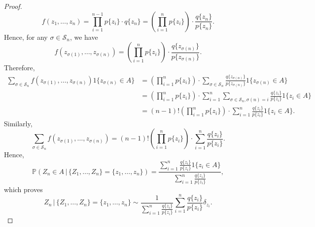 \documentclass[10pt,a4paper]{amsart}
\newcommand{\cS}{\mathcal{S}}
\renewcommand{\P}{\mathbb{P}}
\begin{document}
\begin{proof}
    \begin{equation*}
        f(z_1, \ldots, z_n) = \prod_{i = 1}^{n - 1} p\{z_i\} \cdot q\{z_n\} = \left(\prod_{i = 1}^{n} p\{z_i\}\right) \cdot \frac{q\{z_n\}}{p\{z_n\}}.
    \end{equation*}
    Hence, for any $\sigma \in \cS_n$, we have
    \begin{equation*}
        f(z_{\sigma(1)}, \ldots, z_{\sigma(n)}) = \left(\prod_{i = 1}^{n} p\{z_i\}\right) \cdot \frac{q\{z_{\sigma(n)}\}}{p\{z_{\sigma(n)}\}}.
    \end{equation*}
    Therefore, 
    \begin{equation*}
        \begin{split}
            \sum_{\sigma \in \cS_n} f(z_{\sigma(1)}, \ldots, z_{\sigma(n)}) 1\{z_{\sigma(n)} \in A\} 
            & = \left(\prod_{i = 1}^{n} p\{z_i\}\right) \cdot \sum_{\sigma \in \cS_n} \frac{q\{z_{\sigma(n)}\}}{p\{z_{\sigma(n)}\}} 1\{z_{\sigma(n)} \in A\} \\
            & = \left(\prod_{i = 1}^{n} p\{z_i\}\right) \cdot \sum_{i = 1}^{n} \sum_{\sigma \in \cS_n, \sigma(n) = i} \frac{q\{z_i\}}{p\{z_i\}} 1\{z_i \in A\} \\
            & = (n - 1)! \left(\prod_{i = 1}^{n} p\{z_i\}\right) \cdot \sum_{i = 1}^{n} \frac{q\{z_i\}}{p\{z_i\}} 1\{z_i \in A\}.            
        \end{split}
    \end{equation*}
    Similarly, 
    \begin{equation*}
        \sum_{\sigma \in \cS_n} f(z_{\sigma(1)}, \ldots, z_{\sigma(n)}) = (n - 1)! \left(\prod_{i = 1}^{n} p\{z_i\}\right) \cdot \sum_{i = 1}^{n} \frac{q\{z_i\}}{p\{z_i\}}.
    \end{equation*}
    Hence, 
    \begin{equation*}
        \P(Z_n \in A \, | \, \{Z_1, \ldots, Z_n\} = \{z_1, \ldots, z_n\}) = \frac{\sum_{i = 1}^{n} \frac{q\{z_i\}}{p\{z_i\}} 1\{z_i \in A\}}{\sum_{i = 1}^{n} \frac{q\{z_i\}}{p\{z_i\}}},
    \end{equation*}
    which proves
    \begin{equation*}
        Z_n \, | \, \{Z_1, \ldots, Z_n\} = \{z_1, \ldots, z_n\} \sim \frac{1}{\sum_{i = 1}^{n} \frac{q\{z_i\}}{p\{z_i\}}} \sum_{i = 1}^{n} \frac{q\{z_i\}}{p\{z_i\}} \delta_{z_i}.
    \end{equation*}
\end{proof}
\end{document}
